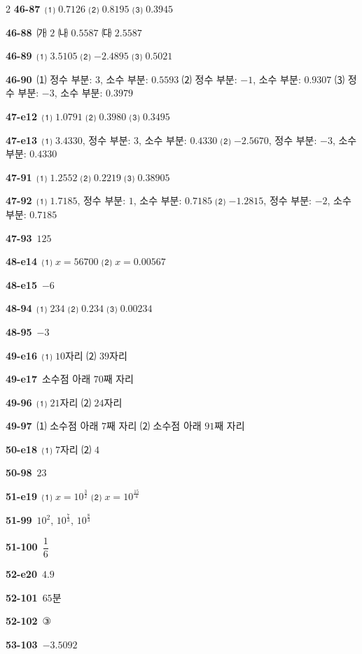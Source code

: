 \documentclass[10pt,a4paper]{article}
\begin{document}
\begin{multicols}{2}
\noindent\textbf{46-87}\ ⑴ $0.7126$ ⑵ $0.8195$ ⑶ $0.3945$\par
\noindent\textbf{46-88}\ ㈎ $2$ ㈏ $0.5587$ ㈐ $2.5587$\par
\noindent\textbf{46-89}\ ⑴ $3.5105$ ⑵ $-2.4895$ ⑶ $0.5021$\par
\noindent\textbf{46-90}\ ⑴ 정수 부분: $3$, 소수 부분: $0.5593$ ⑵ 정수 부분: $-1$, 소수 부분: $0.9307$ ⑶ 정수 부분: $-3$, 소수 부분: $0.3979$\par
\noindent\textbf{47-e12}\ ⑴ $1.0791$ ⑵ $0.3980$ ⑶ $0.3495$\par
\noindent\textbf{47-e13}\ ⑴ $3.4330$, 정수 부분: $3$, 소수 부분: $0.4330$ ⑵ $-2.5670$, 정수 부분: $-3$, 소수 부분: $0.4330$\par
\noindent\textbf{47-91}\ ⑴ $1.2552$ ⑵ $0.2219$ ⑶ $0.38905$\par
\noindent\textbf{47-92}\ ⑴ $1.7185$, 정수 부분: $1$, 소수 부분: $0.7185$ ⑵ $-1.2815$, 정수 부분: $-2$, 소수 부분: $0.7185$\par
\noindent\textbf{47-93}\ $125$\par
\noindent\textbf{48-e14}\ ⑴ $x=56700$ ⑵ $x=0.00567$\par
\noindent\textbf{48-e15}\ $-6$\par
\noindent\textbf{48-94}\ ⑴ $234$ ⑵ $0.234$ ⑶ $0.00234$\par
\noindent\textbf{48-95}\ $-3$\par
\noindent\textbf{49-e16}\ ⑴ $10$자리 ⑵ $39$자리\par
\noindent\textbf{49-e17}\ 소수점 아래 $70$째 자리\par
\noindent\textbf{49-96}\ ⑴ $21$자리 ⑵ $24$자리\par
\noindent\textbf{49-97}\ ⑴ 소수점 아래 $7$째 자리 ⑵ 소수점 아래 $91$째 자리\par
\noindent\textbf{50-e18}\ ⑴ $7$자리 ⑵ $4$\par
\noindent\textbf{50-98}\ $23$\par
\noindent\textbf{51-e19}\ ⑴ $x=10^{\frac{3}{2}}$ ⑵ $x=10^{\frac{15}{4}}$\par
\noindent\textbf{51-99}\ $10^2$, $10^{\frac{7}{3}}$, $10^{\frac{8}{3}}$\par
\noindent\textbf{51-100}\ $\dfrac{1}{6}$\par
\noindent\textbf{52-e20}\ $4.9$\par
\noindent\textbf{52-101}\ $65$분\par
\noindent\textbf{52-102}\ ③\par
\noindent\textbf{53-103}\ $-3.5092$\par

\end{multicols}
\end{document}
